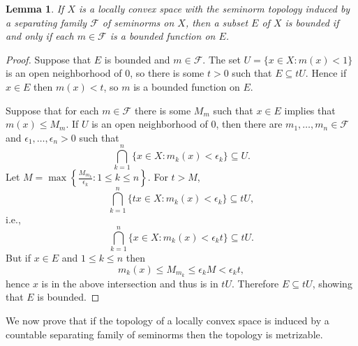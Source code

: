 \documentclass{article}
\newtheorem{lemma}[theorem]{Lemma}
\begin{document}
\begin{lemma}
If $X$ is a locally convex space with the seminorm topology induced by a separating family $\mathscr{F}$ of seminorms on $X$, then a 
subset $E$ of $X$ is bounded if and only if each $m \in \mathscr{F}$ is a bounded function on $E$.
\label{boundedset}
\end{lemma}
\begin{proof}
Suppose that $E$ is bounded and  $m \in \mathscr{F}$. The set $U=\{x \in X: m(x)<1\}$ is an open neighborhood of $0$, so there is some $t>0$ such that 
$E \subseteq tU$. Hence if $x \in E$ then $m(x)<t$, so $m$ is a bounded function on $E$.

Suppose that for each $m \in \mathscr{F}$ there is some $M_m$ such that $x \in E$ implies that $m(x) \leq M_m$.
If $U$ is an open neighborhood of $0$, then there are $m_1,\ldots,m_n \in \mathscr{F}$ and $\epsilon_1,\ldots,\epsilon_n>0$
such that 
\[
\bigcap_{k=1}^n \{x \in X: m_k(x)<\epsilon_k\} \subseteq U.
\]
Let $M=\max \left\{ \frac{M_{m_k}}{\epsilon_k}: 1 \leq k \leq n\right\}$. For $t>M$,
\[
\bigcap_{k=1}^n \{tx \in X: m_k(x) < \epsilon_k\} \subseteq tU,
\]
i.e.,
\[
\bigcap_{k=1}^n \{x \in X: m_k(x) < \epsilon_k t\} \subseteq tU.
\]
But if $x \in E$ and $1 \leq k \leq n$ then
\[
m_k(x) \leq M_{m_k} \leq \epsilon_k M < \epsilon_k t,
\]
hence $x$ is in the above intersection and thus is in $tU$. Therefore $E \subseteq tU$, showing that $E$ is bounded.
\end{proof}


We now prove that if the topology of a locally convex space is induced by a countable separating family of seminorms then the topology is metrizable.
\end{document}
